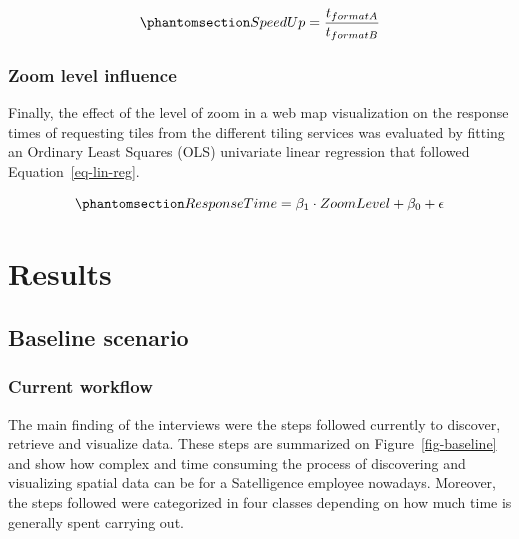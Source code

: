 \documentclass[
  oneside,
  open=any]{scrbook}
\begin{document}
\begin{equation}\phantomsection\label{eq-speed-up}{ SpeedUp = \frac{t_{format A}}{t_{format B}} }\end{equation}

\subsection{Zoom level influence}\label{zoom-level-influence}

Finally, the effect of the level of zoom in a web map visualization on
the response times of requesting tiles from the different tiling
services was evaluated by fitting an Ordinary Least Squares (OLS)
univariate linear regression that followed Equation~\ref{eq-lin-reg}.

\begin{equation}\phantomsection\label{eq-lin-reg}{ ResponseTime = \beta_1 \cdot ZoomLevel + \beta_0 + \epsilon }\end{equation}

\chapter{Results}\label{results}

\section{Baseline scenario}\label{baseline-scenario-1}

\subsection{Current workflow}\label{current-workflow}

The main finding of the interviews were the steps followed currently to
discover, retrieve and visualize data. These steps are summarized on
Figure~\ref{fig-baseline} and show how complex and time consuming the
process of discovering and visualizing spatial data can be for a
Satelligence employee nowadays. Moreover, the steps followed were
categorized in four classes depending on how much time is generally
spent carrying out.
\end{document}
